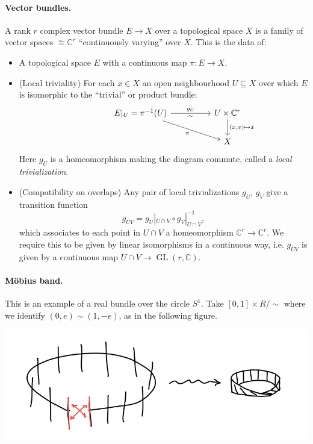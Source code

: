 \documentclass{article}
\theoremstyle{definition}
\DeclareMathOperator{\GL}{GL}
\newcommand{\C}{\mathbb{C}}
\begin{document}
\paragraph{Vector bundles.} A rank $r$ complex vector bundle $E\to X$ over a
topological space $X$ is a family of vector spaces $\cong\C^r$ ``continuously
varying'' over $X$. This is the data of:
\begin{itemize}
    \item A topological space $E$ with a continuous map $\pi:E\to X$.

    \item (Local triviality) For each $x\in X$ an open neighbourhood
        $U\subseteq X$ over which $E$ is isomorphic to the ``trivial'' or
        product bundle:
        \begin{equation*}
            \begin{tikzcd}[column sep=huge]
                &E|_U = \pi^{-1}(U) \ar[dr,"\pi"'] \ar[r,"g_U","\sim"']
                    &U\times\C^r \ar[d,"{(x,v)\mapsto x}"] \\
                & &X
            \end{tikzcd}
        \end{equation*}
        Here $g_U$ is a homeomorphism making the diagram commute, called a
        \emph{local trivialization}.

    \item (Compatibility on overlaps) Any pair of local trivializations $g_U$,
        $g_V$ give a transition function
        \begin{equation*}
            g_{UV} = g_U|_{U\cap V}\circ g_V|_{U\cap V}^{-1},
        \end{equation*}
        which associates to each point in $U\cap V$ a homeomorphism
        $\C^r\to\C^r$. We require this to be given by linear isomorphisms in a
        continuous way, i.e. $g_{UV}$ is given by a continuous map
        $U\cap V\to\GL(r,\C)$.
\end{itemize}

\paragraph{M\"obius band.} This is an example of a real bundle over the circle
$S^1$. Take $[0,1]\times R/\sim$ where we identify $(0,e)\sim(1,-e)$, as in the
following figure.

\begin{center}
    \includegraphics[scale=0.4]{chern_mobius1}
\end{center}
\end{document}
